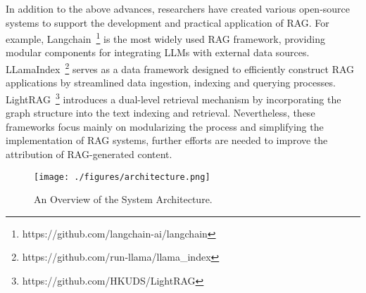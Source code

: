 In addition to the above advances, researchers have created various open-source systems \cite{Liu_LlamaIndex_2022, guo2024lightrag, jin2024flashrag, zhang2024raglab} to support the development and practical application of \ac{RAG}.
For example, Langchain~\footnote{https://github.com/langchain-ai/langchain} is the most widely used \ac{RAG} framework, providing modular components for integrating \acp{LLM} with external data sources.
LLamaIndex~\footnote{https://github.com/run-llama/llama\_index} serves as a data framework designed to efficiently construct \ac{RAG} applications by streamlined data ingestion, indexing and querying processes.
LightRAG~\footnote{https://github.com/HKUDS/LightRAG} introduces a dual-level retrieval mechanism by incorporating the graph structure into the text indexing and retrieval. 
Nevertheless, these frameworks focus mainly on modularizing the process and simplifying the implementation of \ac{RAG} systems, further efforts are needed to improve the attribution of RAG-generated content. 

\begin{figure}[!t]
\centering
\texttt{[image: ./figures/architecture.png]}
\caption{An Overview of the System Architecture.}
\label{fig:architecture}
\end{figure}

